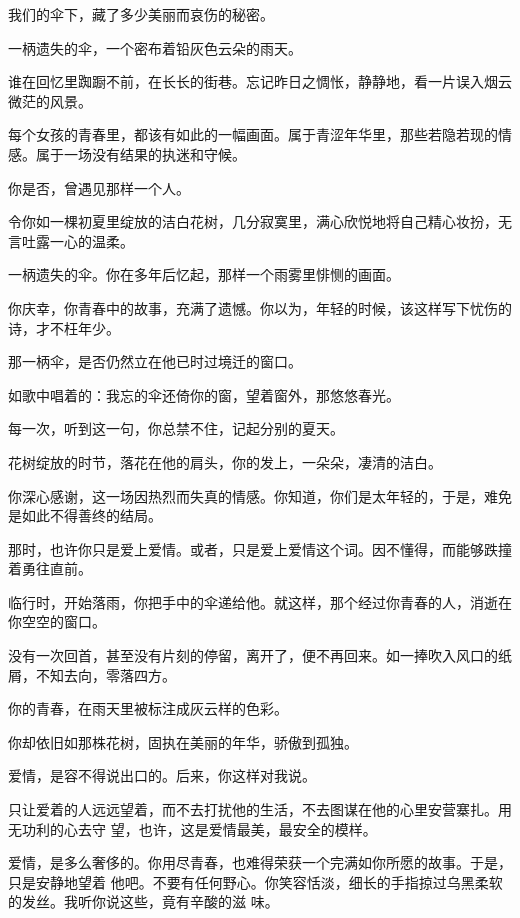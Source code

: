 \documentclass[12pt,a4paper]{article}
\def\blankrev{\vspace{1ex}}									%
\begin{document}
	\endwriting



		我们的伞下，藏了多少美丽而哀伤的秘密。


		\blankrev
		一柄遗失的伞，一个密布着铅灰色云朵的雨天。\par
		谁在回忆里踟蹰不前，在长长的街巷。忘记昨日之惆怅，静静地，看一片误入烟云微茫的风景。\par
		每个女孩的青春里，都该有如此的一幅画面。属于青涩年华里，那些若隐若现的情感。属于一场没有结果的执迷和守候。\par
		你是否，曾遇见那样一个人。\par
		令你如一棵初夏里绽放的洁白花树，几分寂寞里，满心欣悦地将自己精心妆扮，无言吐露一心的温柔。\par
		一柄遗失的伞。你在多年后忆起，那样一个雨雾里悱恻的画面。\par
		你庆幸，你青春中的故事，充满了遗憾。你以为，年轻的时候，该这样写下忧伤的诗，才不枉年少。\par
		那一柄伞，是否仍然立在他已时过境迁的窗口。\par
		如歌中唱着的：我忘的伞还倚你的窗，望着窗外，那悠悠春光。\par
		每一次，听到这一句，你总禁不住，记起分别的夏天。\par
		花树绽放的时节，落花在他的肩头，你的发上，一朵朵，凄清的洁白。\par
		你深心感谢，这一场因热烈而失真的情感。你知道，你们是太年轻的，于是，难免是如此不得善终的结局。

		那时，也许你只是爱上爱情。或者，只是爱上爱情这个词。因不懂得，而能够跌撞着勇往直前。

		临行时，开始落雨，你把手中的伞递给他。就这样，那个经过你青春的人，消逝在你空空的窗口。\par
		没有一次回首，甚至没有片刻的停留，离开了，便不再回来。如一捧吹入风口的纸屑，不知去向，零落四方。

		你的青春，在雨天里被标注成灰云样的色彩。\par
		你却依旧如那株花树，固执在美丽的年华，骄傲到孤独。

		爱情，是容不得说出口的。后来，你这样对我说。

		只让爱着的人远远望着，而不去打扰他的生活，不去图谋在他的心里安营寨扎。用无功利的心去守
	望，也许，这是爱情最美，最安全的模样。

		爱情，是多么奢侈的。你用尽青春，也难得荣获一个完满如你所愿的故事。于是，只是安静地望着
	他吧。不要有任何野心。你笑容恬淡，细长的手指掠过乌黑柔软的发丝。我听你说这些，竟有辛酸的滋
	味。
\end{document}
